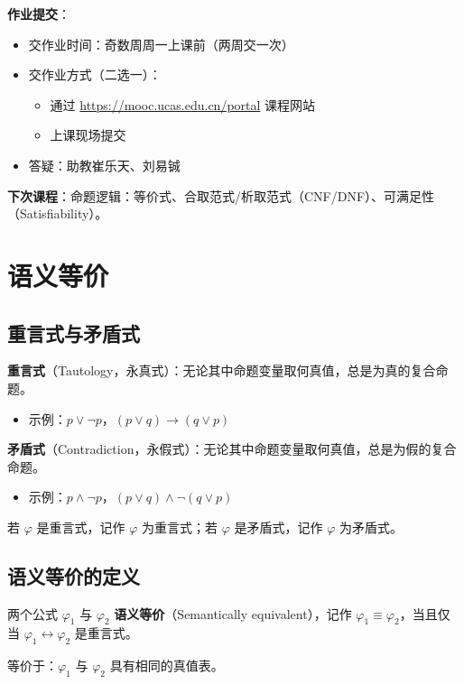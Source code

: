 \documentclass[UTF8,11pt,a4paper]{ctexbook}   %
\theoremstyle{definition}
\begin{document}
\textbf{作业提交}：
\begin{itemize}
    \item 交作业时间：奇数周周一上课前（两周交一次）
    \item 交作业方式（二选一）：
    \begin{itemize}
        \item 通过 \url{https://mooc.ucas.edu.cn/portal} 课程网站
        \item 上课现场提交
    \end{itemize}
    \item 答疑：助教崔乐天、刘易铖
\end{itemize}

\textbf{下次课程}：命题逻辑：等价式、合取范式/析取范式（CNF/DNF）、可满足性（Satisfiability）。

\section{语义等价}

\subsection{重言式与矛盾式}

\textbf{重言式}（Tautology，永真式）：无论其中命题变量取何真值，总是为真的复合命题。
\begin{itemize}
    \item 示例：$p \lor \neg p$，$(p \lor q) \to (q \lor p)$
\end{itemize}

\textbf{矛盾式}（Contradiction，永假式）：无论其中命题变量取何真值，总是为假的复合命题。
\begin{itemize}
    \item 示例：$p \land \neg p$，$(p \lor q) \land \neg(q \lor p)$
\end{itemize}

若 $\varphi$ 是重言式，记作 $\varphi$ 为重言式；若 $\varphi$ 是矛盾式，记作 $\varphi$ 为矛盾式。

\subsection{语义等价的定义}

两个公式 $\varphi_1$ 与 $\varphi_2$ \textbf{语义等价}（Semantically equivalent），记作 $\varphi_1 \equiv \varphi_2$，当且仅当 $\varphi_1 \leftrightarrow \varphi_2$ 是重言式。

等价于：$\varphi_1$ 与 $\varphi_2$ 具有相同的真值表。
\end{document}
